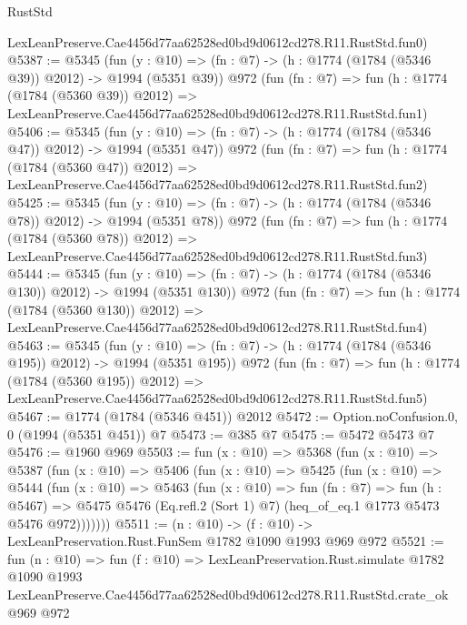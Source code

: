 \begin{lexlean}{RustStd}
\begin{coremodule}
    LexLeanPreserve.Cae4456d77aa62528ed0bd9d0612cd278.R11.RustStd.fun0)
@5387 := @5345
    (fun (y : @10) => (fn : @7) -> (h : @1774 (@1784 (@5346 @39)) @2012) -> @1994 (@5351 @39))
    @972
    (fun (fn : @7) =>
    fun (h : @1774 (@1784 (@5360 @39)) @2012) =>
    LexLeanPreserve.Cae4456d77aa62528ed0bd9d0612cd278.R11.RustStd.fun1)
@5406 := @5345
    (fun (y : @10) => (fn : @7) -> (h : @1774 (@1784 (@5346 @47)) @2012) -> @1994 (@5351 @47))
    @972
    (fun (fn : @7) =>
    fun (h : @1774 (@1784 (@5360 @47)) @2012) =>
    LexLeanPreserve.Cae4456d77aa62528ed0bd9d0612cd278.R11.RustStd.fun2)
@5425 := @5345
    (fun (y : @10) => (fn : @7) -> (h : @1774 (@1784 (@5346 @78)) @2012) -> @1994 (@5351 @78))
    @972
    (fun (fn : @7) =>
    fun (h : @1774 (@1784 (@5360 @78)) @2012) =>
    LexLeanPreserve.Cae4456d77aa62528ed0bd9d0612cd278.R11.RustStd.fun3)
@5444 := @5345
    (fun (y : @10) => (fn : @7) -> (h : @1774 (@1784 (@5346 @130)) @2012) -> @1994 (@5351 @130))
    @972
    (fun (fn : @7) =>
    fun (h : @1774 (@1784 (@5360 @130)) @2012) =>
    LexLeanPreserve.Cae4456d77aa62528ed0bd9d0612cd278.R11.RustStd.fun4)
@5463 := @5345
    (fun (y : @10) => (fn : @7) -> (h : @1774 (@1784 (@5346 @195)) @2012) -> @1994 (@5351 @195))
    @972
    (fun (fn : @7) =>
    fun (h : @1774 (@1784 (@5360 @195)) @2012) =>
    LexLeanPreserve.Cae4456d77aa62528ed0bd9d0612cd278.R11.RustStd.fun5)
@5467 := @1774 (@1784 (@5346 @451)) @2012
@5472 := Option.noConfusion.{0, 0} (@1994 (@5351 @451)) @7
@5473 := @385 @7
@5475 := @5472 @5473 @7
@5476 := @1960 @969
@5503 := fun (x : @10) =>
  @5368
    (fun (x : @10) =>
    @5387
      (fun (x : @10) =>
      @5406
        (fun (x : @10) =>
        @5425
          (fun (x : @10) =>
          @5444
            (fun (x : @10) =>
            @5463
              (fun (x : @10) =>
              fun (fn : @7) =>
              fun (h : @5467) =>
              @5475 @5476 (Eq.refl.{2} (Sort 1) @7) (heq_of_eq.{1} @1773 @5473 @5476 @972)))))))
@5511 := (n : @10) -> (f : @10) -> LexLeanPreservation.Rust.FunSem @1782 @1090 @1993 @969 @972
@5521 := fun (n : @10) =>
  fun (f : @10) =>
  LexLeanPreservation.Rust.simulate
    @1782
    @1090
    @1993
    LexLeanPreserve.Cae4456d77aa62528ed0bd9d0612cd278.R11.RustStd.crate_ok
    @969
    @972
\end{coremodule}
\end{lexlean}
